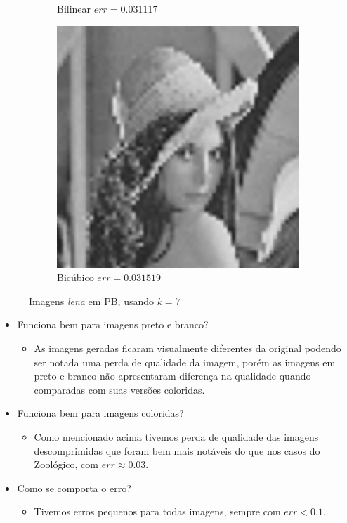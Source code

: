 \documentclass[12pt, a4paper]{article}
\begin{document}
\begin{figure}[h]
\begin{subfigure}{.3\textwidth}
            \caption{Bilinear $err = 0.031117$}
        \end{subfigure}
        \begin{subfigure}{.3\textwidth}
            \includegraphics[width=.95\textwidth]{../lenaBWBC7.png}
            \caption{Bicúbico $err = 0.031519$}
        \end{subfigure}
        \caption{Imagens \emph{lena} em PB, usando $k=7$}
    \end{figure}

    \newpage
    \begin{itemize}
        \item Funciona bem para imagens preto e branco?
        \begin{itemize}
            \item As imagens geradas ficaram visualmente diferentes da original
            podendo ser notada uma perda de qualidade da imagem, porém as imagens
            em preto e branco não apresentaram diferença na qualidade quando comparadas
            com suas versões coloridas.
        \end{itemize}
        \item Funciona bem para imagens coloridas?
        \begin{itemize}
            \item Como mencionado acima tivemos perda de qualidade das imagens
            descomprimidas que foram bem mais notáveis do que nos casos do Zoológico,
            com $err \approx 0.03$.
        \end{itemize}
        \item Como se comporta o erro?
        \begin{itemize}
            \item Tivemos erros pequenos para todas imagens, sempre com $err < 0.1$.
        \end{itemize}
    \end{itemize}
\end{document}
